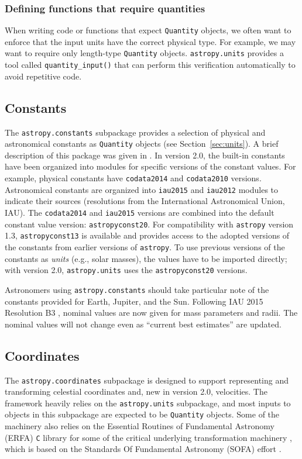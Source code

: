 \documentclass[modern]{aastex61}
\newcommand{\package}[1]{\texttt{#1}\xspace}
\newcommand{\astropypkg}{\package{astropy}}
\newcommand{\sectionname}{Section\xspace}
\begin{document}
\subsubsection{Defining functions that require quantities}
        When writing code or
        functions that expect \texttt{Quantity} objects, we often want to
        enforce that the input units have the correct physical type.
        For example, we may want to require only length-type \texttt{Quantity}
        objects.
        \texttt{astropy.units} provides a tool called \texttt{quantity\_input()}
        that can perform this verification automatically to avoid repetitive
        code.


\subsection{Constants}

The \texttt{astropy.constants} subpackage provides a selection of physical and
astronomical constants as \texttt{Quantity} objects (see
\sectionname~\ref{sec:units}).
A brief description of this package was given in \cite{astropy}.
In version 2.0, the built-in constants have been organized into modules for
specific versions of the constant values.
For example, physical constants have \texttt{codata2014} \citep{codata2014} and
\texttt{codata2010} versions.
Astronomical constants are organized into \texttt{iau2015} and \texttt{iau2012}
modules to indicate their sources (resolutions from the International
Astronomical Union, IAU).
The \texttt{codata2014} and \texttt{iau2015} versions are combined into the
default constant value version: \texttt{astropyconst20}.
For compatibility with \astropypkg version 1.3,  \texttt{astropyconst13}
is available and provides access to the adopted versions of the
constants from earlier versions of \astropypkg.
To use previous versions of the constants as \emph{units} (e.g., solar masses),
the values have to be imported directly; with version
2.0, \texttt{astropy.units} uses the \texttt{astropyconst20} versions.

Astronomers using \texttt{astropy.constants} should take particular note of the
constants provided for Earth, Jupiter, and the Sun.
Following IAU 2015 Resolution B3 \citep{iau2015b3}, nominal values are now given
for mass parameters and radii.
The nominal values will not change even as ``current best estimates'' are
updated.

\subsection{Coordinates}
\label{sec:coordinates}
The \package{astropy.coordinates} subpackage is designed to support representing
and transforming celestial coordinates and, new in version 2.0, velocities.
The framework heavily relies on the \package{astropy.units} subpackage, and most
inputs to objects in this subpackage are expected to be \texttt{Quantity}
objects.
Some of the machinery also relies on the Essential Routines of Fundamental
Astronomy (ERFA) \texttt{C} library for some of the critical underlying
transformation machinery \citep{erfa}, which is based on the Standards Of
Fundamental Astronomy (SOFA) effort \citep{sofa}.
\end{document}
